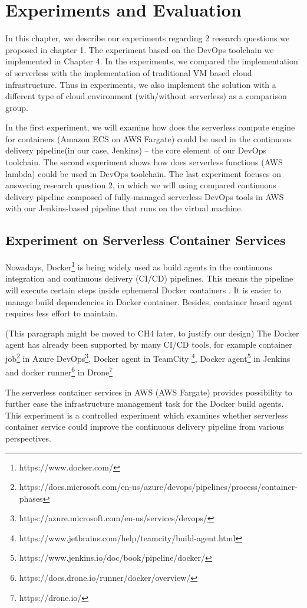\chapter{Experiments and Evaluation}
In this chapter, we describe our experiments regarding 2 research questions we proposed in chapter 1. The experiment based on the DevOps toolchain we implemented in Chapter 4. In the experiments, we compared the implementation of serverless with the implementation of traditional VM based cloud infrastructure. Thus in experiments, we also implement the solution with a different type of cloud environment (with/without serverless) as a comparison group.
\par
In the first experiment, we will examine how does the serverless compute engine for containers (Amazon ECS on AWS Fargate) could be used in the continuous delivery pipeline(in our case, Jenkins) -- the core element of our DevOps toolchain. The second experiment shows how does serverless functions (AWS lambda) could be used in DevOps toolchain. The last experiment focuses on answering research question 2, in which we will using compared continuous delivery pipeline composed of fully-managed serverless DevOps tools in AWS with our Jenkins-based pipeline that runs on the virtual machine.
\section{Experiment on Serverless Container Services}
Nowadays, Docker\footnote{https://www.docker.com/} is being widely used as build agents in the continuous integration and continuous delivery (CI/CD) pipelines. 
This means the pipeline will execute certain steps inside ephemeral Docker containers \cite{Overview44:online}. It is easier to manage build dependencies in Docker container. Besides, container based agent requires less effort to maintain. 
\par
(This paragraph might be moved to CH4 later, to justify our design)
The Docker agent has already been supported by many CI/CD tools, for example container job\footnote{https://docs.microsoft.com/en-us/azure/devops/pipelines/process/container-phases} in Azure DevOps\footnote{https://azure.microsoft.com/en-us/services/devops/}, Docker agent in TeamCity \footnote{https://www.jetbrains.com/help/teamcity/build-agent.html}, Docker agent\footnote{https://www.jenkins.io/doc/book/pipeline/docker/} in Jenkins and docker runner\footnote{https://docs.drone.io/runner/docker/overview/} in Drone\footnote{https://drone.io/}
\par
The serverless container services in AWS (AWS Fargate) provides possibility to further ease the infrastructure management task for the Docker build agents. 
This experiment is a controlled experiment which examines whether serverless container service could improve the continuous delivery pipeline from various perspectives.
